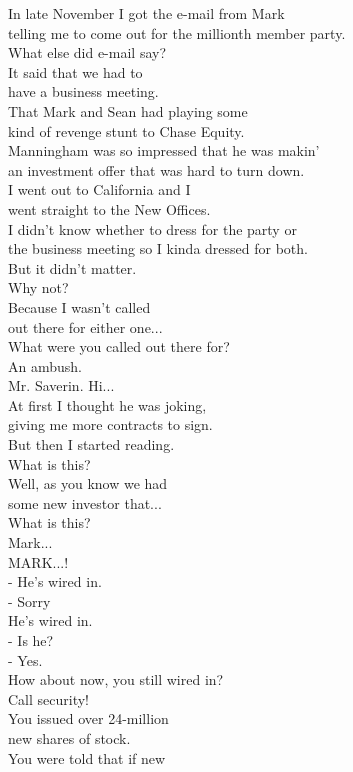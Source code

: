 \documentclass{article}
\begin{document}
\begin{multicols}{3}
In late November I got the e-mail from Mark\\
telling me to come out for the millionth member party.\\
What else did e-mail say?\\
It said that we had to\\
have a business meeting.\\
That Mark and Sean had playing some\\
kind of revenge stunt to Chase Equity.\\
Manningham was so impressed that he was makin'\\
an investment offer that was hard to turn down.\\
I went out to California and I\\
went straight to the New Offices.\\
I didn't know whether to dress for the party or\\
the business meeting so I kinda dressed for both.\\
But it didn't matter.\\
Why not?\\
Because I wasn't called\\
out there for either one...\\
What were you called out there for?\\
An ambush.\\
Mr. Saverin. Hi...\\
At first I thought he was joking,\\
giving me more contracts to sign.\\
But then I started reading.\\
What is this?\\
Well, as you know we had\\
some new investor that...\\
What is this?\\
Mark...\\
MARK...!\\
- He's wired in.\\
- Sorry\\
He's wired in.\\
- Is he?\\
- Yes.\\
How about now, you still wired in?\\
Call security!\\
You issued over 24-million\\
new shares of stock.\\
You were told that if new\\

\end{multicols}
\end{document}
